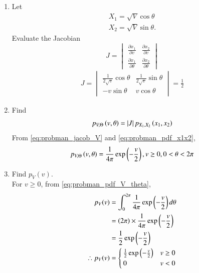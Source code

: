 \begin{enumerate}[label=\thesubsection.\arabic*.,ref=\thesubsection.\theenumi]
%
\item
Let 
\begin{align}
 X_1 = \sqrt{V}\cos \theta
\\
 X_2 = \sqrt{V} \sin \theta.
\end{align}
Evaluate the Jacobian 
%
\begin{equation}
J =
\begin{vmatrix}
\frac{\partial x_1}{\partial v} & \frac{\partial x_2}{\partial v} \\
\frac{\partial x_1}{\partial \theta} & \frac{\partial x_2}{\partial \theta} 
\end{vmatrix}
\end{equation}
%
\solution
\begin{align}
J=\begin{vmatrix}
     \frac{1}{2\sqrt{v}}\cos\theta & \frac{1}{2\sqrt{v}}\sin\theta\\
       -v\sin\theta & v\cos\theta
\end{vmatrix}=\frac{1}{2}
\label{eq:probman_jacob_V}
\end{align}
\item
Find
%
\begin{equation}
p_{V,\Theta}\left(v,\theta\right) = \left\vert J\right\vert p_{X_1,X_2}\left(x_1,x_2\right)
\end{equation}
%
\solution From \eqref{eq:probman_jacob_V} and \eqref{eq:probman_pdf_x1x2},
\begin{align}
p_{V,\Theta}\left(v,\theta\right)=\frac{1}{4\pi}\exp\left(-\frac{v}{2}\right), v \ge 0, 0 < \theta < 2\pi
\label{eq:probman_pdf_V_theta}
\end{align}
%
\item
Find $p_{V}(v)$.
\\
\solution For $v \ge 0$, from \eqref{eq:probman_pdf_V_theta},
\begin{align}
p_{V}(v) &= \int_{0}^{2\pi} \frac{1}{4\pi}\exp\left(-\frac{v}{2}\right) d \theta \\
&= \left(2\pi\right) \times \frac{1}{4\pi}\exp\left(-\frac{v}{2}\right) \\
&= \frac{1}{2}\exp\left(-\frac{v}{2}\right)\\
\therefore p_{V}(v) &= 
\begin{cases}
\frac{1}{2}\exp\left(-\frac{v}{2}\right) & v\geq 0 \\
0 & v< 0
\end{cases}
\label{eq:probman_pdf_V}
\end{align}
%


\end{enumerate}
